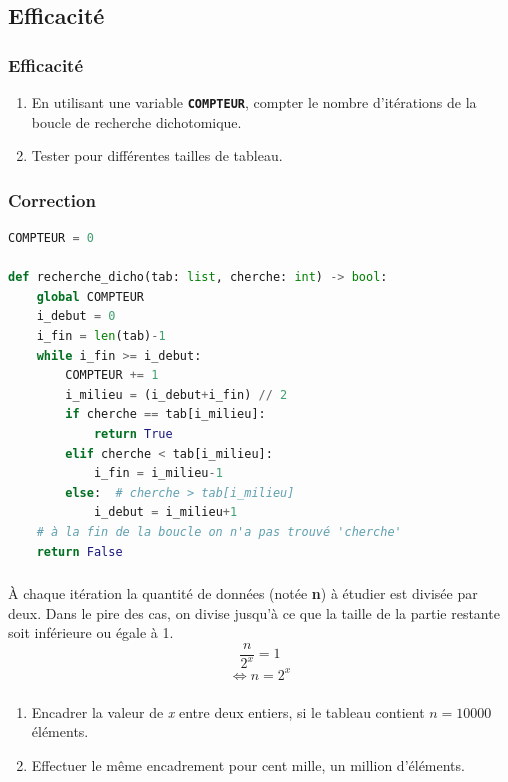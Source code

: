 \documentclass[svgnames,11pt]{beamer}
\begin{document}
\subsection{Efficacité}
\begin{frame}
    \frametitle{Efficacité}

    \begin{activite}
        \begin{enumerate}
            \item En utilisant une variable \textbf{\texttt{COMPTEUR}}, compter le nombre d'itérations de la boucle de recherche dichotomique.
            \item Tester pour différentes tailles de tableau.
        \end{enumerate}
        \end{activite}

\end{frame}
\begin{frame}[fragile]
    \frametitle{Correction}

\begin{center}
\begin{lstlisting}[language=Python , basicstyle=\small, xleftmargin=2em, xrightmargin=2em]
COMPTEUR = 0

def recherche_dicho(tab: list, cherche: int) -> bool:
    global COMPTEUR
    i_debut = 0
    i_fin = len(tab)-1
    while i_fin >= i_debut:
        COMPTEUR += 1
        i_milieu = (i_debut+i_fin) // 2
        if cherche == tab[i_milieu]:
            return True
        elif cherche < tab[i_milieu]:
            i_fin = i_milieu-1
        else:  # cherche > tab[i_milieu]
            i_debut = i_milieu+1
    # à la fin de la boucle on n'a pas trouvé 'cherche'
    return False
\end{lstlisting}
\end{center}

\end{frame}
\begin{frame}
    \frametitle{}
    À chaque itération la quantité de données (notée \textbf{n}) à étudier est divisée par deux. Dans le pire des cas, on divise jusqu'à ce que la taille de la partie restante soit inférieure ou égale à 1.
    {\Large$$\dfrac{n}{2^x}=1$$
    $$\Leftrightarrow n=2^x$$}
    

\end{frame}
\begin{frame}
    \frametitle{}

    \begin{activite}
        \begin{enumerate}
            \item Encadrer la valeur de \emph{x} entre deux entiers, si le tableau contient $n=10000$ éléments.
            \item Effectuer le même encadrement pour cent mille, un million d'éléments.
        \end{enumerate}
        \end{activite}

\end{frame}
\end{document}
